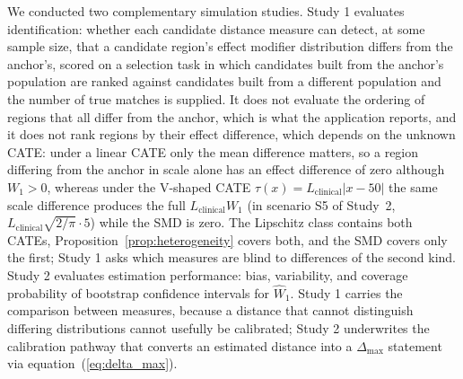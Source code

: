 \documentclass[AMA,Times1COL]{WileyNJDv5}
\begin{document}
We conducted two complementary simulation studies. Study 1 evaluates identification: whether each candidate distance measure can detect, at some sample size, that a candidate region's effect modifier distribution differs from the anchor's, scored on a selection task in which candidates built from the anchor's population are ranked against candidates built from a different population and the number of true matches is supplied. It does not evaluate the ordering of regions that all differ from the anchor, which is what the application reports, and it does not rank regions by their effect difference, which depends on the unknown CATE: under a linear CATE only the mean difference matters, so a region differing from the anchor in scale alone has an effect difference of zero although $W_1 > 0$, whereas under the V-shaped CATE $\tau(x) = L_{\text{clinical}} |x - 50|$ the same scale difference produces the full $L_{\text{clinical}} W_1$ (in scenario S5 of Study~2, $L_{\text{clinical}} \sqrt{2/\pi} \cdot 5$) while the SMD is zero. The Lipschitz class contains both CATEs, Proposition~\ref{prop:heterogeneity} covers both, and the SMD covers only the first; Study 1 asks which measures are blind to differences of the second kind. Study 2 evaluates estimation performance: bias, variability, and coverage probability of bootstrap confidence intervals for $\widehat{W}_1$. Study 1 carries the comparison between measures, because a distance that cannot distinguish differing distributions cannot usefully be calibrated; Study 2 underwrites the calibration pathway that converts an estimated distance into a $\Delta_{\max}$ statement via equation~(\ref{eq:delta_max}).
\end{document}
